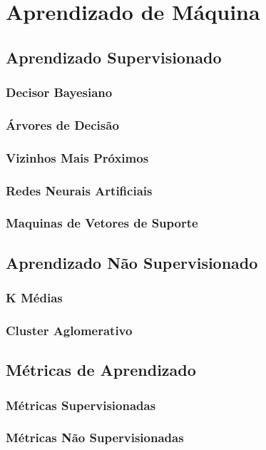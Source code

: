 


\chapter{Aprendizado de Máquina}
\label{chap:MachineLearning}

\section{Aprendizado Supervisionado}
\subsection{Decisor Bayesiano}
\subsection{Árvores de Decisão}
\subsection{Vizinhos Mais Próximos}
\subsection{Redes Neurais Artificiais}
\subsection{Maquinas de Vetores de Suporte}

\section{Aprendizado Não Supervisionado}
\subsection{K Médias}
\subsection{Cluster Aglomerativo}

\section{Métricas de Aprendizado}
\subsection{Métricas Supervisionadas}
\subsection{Métricas Não Supervisionadas}